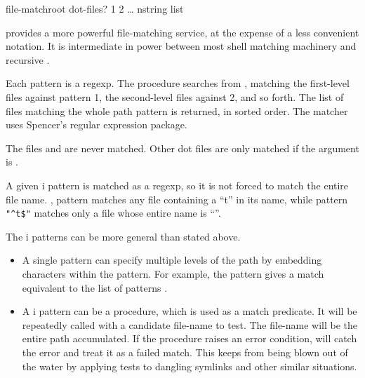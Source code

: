\begin{defundesc}{file-match}{root dot-files? 1 2 {\ldots} n}{string list}

     provides a more powerful file-matching service, at the
    expense of a less convenient notation. It is intermediate in
    power between most shell matching machinery and recursive .

    Each pattern is a regexp. The procedure searches from ,
    matching the first-level files against pattern 1, the
    second-level files against 2, and so forth.
    The list of files matching the whole path pattern is returned, 
    in sorted order.
    The matcher uses Spencer's regular expression package.

    The files  and  are never matched. Other dot files are only
    matched if the  argument is \sharpt.

    A given i pattern is matched as a regexp, so it is not forced
    to match the entire file name. \Eg, pattern  matches any
    file containing a ``t'' in its name, while pattern \verb|"^t$"| matches
    only a file whose entire name is ``''.

    The i patterns can be more general than stated above. 
    \begin{itemize}
    \item A single pattern can specify multiple levels of the path by
      embedding \ex{/} characters within the pattern. For example,
      the pattern  gives a match equivalent to the
      list of patterns .

    \item A i pattern can be a procedure, 
      which is used as a match predicate.
      It will be repeatedly called with a candidate file-name to test.
      The file-name will be the entire path accumulated.
      If the procedure raises an error condition,  will
      catch the error and treat it as a failed match.
      This keeps  from being blown out of the water
      by applying tests to dangling symlinks and other similar situations.


\end{itemize}
\end{defundesc}
